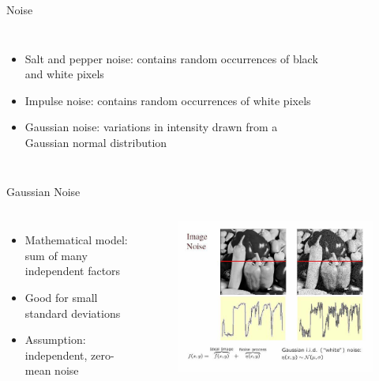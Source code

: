\begin{frame}[t,fragile]{Noise}
    \begin{columns}[t]
        \begin{itemize}
            \item Salt and pepper noise: contains random occurrences of black and white pixels
            \item Impulse noise: contains random occurrences of white pixels
            \item Gaussian noise: variations in intensity drawn from a Gaussian normal distribution
        \end{itemize}
            \begin{figure}
              \centering
              \caption{}
            \end{figure}
    \end{columns}
\end{frame}


\begin{frame}[t,fragile]{Gaussian Noise}
    \begin{columns}[t]
        \begin{itemize}
            \item Mathematical model: sum of many independent factors
            \item Good for small standard deviations
            \item Assumption: independent, zero-mean noise
        \end{itemize}
            \begin{figure}
              \centering
              \includegraphics[width=\textwidth]{./figures/gaussian_noise.jpg}
              \caption{}
            \end{figure}
    \end{columns}
\end{frame}


